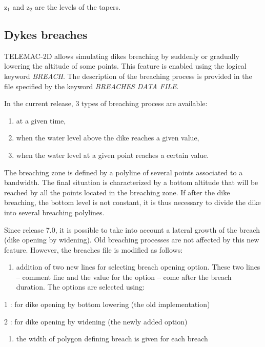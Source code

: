 \documentclass{article} %
\begin{document}
 z${}_{1}$ and z${}_{2}$ are the levels of the tapers.


\subsection{ Dykes breaches}

 TELEMAC-2D allows simulating dikes breaching by suddenly or gradually lowering the altitude of some points. This feature is enabled using the logical keyword \textit{BREACH}. The description of the breaching process is provided in the file specified by the keyword \textit{BREACHES DATA FILE}.

 In the current release, 3 types of breaching process are available:

\begin{enumerate}
\item  at a given time,

\item  when the water level above the dike reaches a given value,

\item  when the water level at a given point reaches a certain value.
\end{enumerate}

 The breaching zone is defined by a polyline of several points associated to a bandwidth. The final situation is characterized by a bottom altitude that will be reached by all the points located in the breaching zone. If after the dike breaching, the bottom level is not constant, it is thus necessary to divide the dike into several breaching polylines.

 Since release 7.0, it is possible to take into account a lateral growth of the breach (dike opening by widening). Old breaching processes are not affected by this new feature. However, the breaches file is modified as follows:

\begin{enumerate}
\item  addition of two new lines for selecting breach opening option. These two lines -- comment line and the value for the option -- come after the breach duration. The options are selected using:
\end{enumerate}

 1 : for dike opening by bottom lowering (the old implementation)

             2 : for dike opening by widening (the newly added option)

\begin{enumerate}
\item  the width of polygon defining breach is given for each breach
\end{enumerate}
\end{document}
